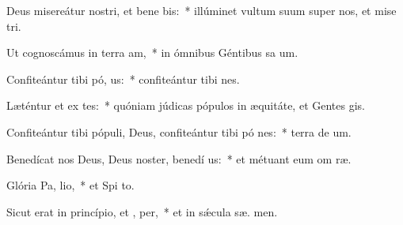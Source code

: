 \item Deus misereátur nostri, et bene bis:~* illúminet vultum suum super nos, et mise tri.
\item Ut cognoscámus in terra  am,~* in ómnibus Géntibus sa um.
\item Confiteántur tibi pó, us:~* confiteántur tibi  nes.
\item Læténtur et ex tes:~* quóniam júdicas pópulos in æquitáte, et Gentes   gis.
\item Confiteántur tibi pópuli, Deus, confiteántur tibi pó nes:~* terra de  um.
\item Benedícat nos Deus, Deus noster, benedí  us:~* et métuant eum om  ræ.
\item Glória Pa,  lio,~* et Spi to.
\item Sicut erat in princípio, et ,  per,~* et in sǽcula sæ. men.
